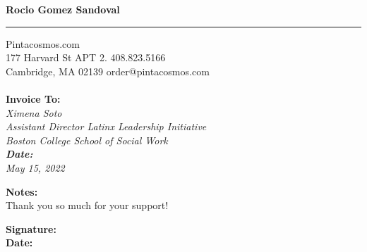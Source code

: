 \documentclass{invoice}
\def \tab {\hspace*{3ex}}
\begin{document}
\hfil{\Huge\bf Rocio Gomez Sandoval}\hfil
\bigskip\break
\hrule
Pintacosmos.com \\
177 Harvard St APT 2. \hfill 408.823.5166 \\
Cambridge, MA 02139 \hfill order@pintacosmos.com
\\ \\
{\bf Invoice To:} \\
\tab \em{Ximena Soto} \\
\tab Assistant Director Latinx Leadership Initiative \\
\tab Boston College School of Social Work \\

{\bf Date:} \\
\tab May 15, 2022 \\


\begin{invoiceTable}
\end{invoiceTable}

{\bf Notes:} \\
\tab Thank you so much for your support!

\bigskip
\bigskip
\bigskip
\bigskip
\bigskip

{\bf Signature:} \\
\bigskip
{\bf Date:} \\
\end{document}
